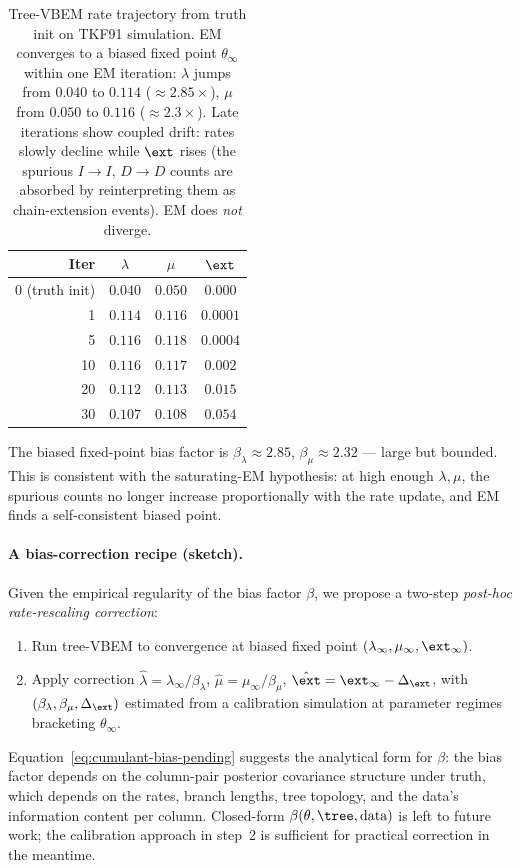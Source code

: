 \begin{table}[ht]
\centering\small
\begin{tabular}{rccc}
\toprule
Iter & $\lambda$ & $\mu$ & $\ext$ \\
\midrule
0 (truth init) & $0.040$ & $0.050$ & $0.000$ \\
1               & $0.114$ & $0.116$ & $0.0001$ \\
5               & $0.116$ & $0.118$ & $0.0004$ \\
10              & $0.116$ & $0.117$ & $0.002$ \\
20              & $0.112$ & $0.113$ & $0.015$ \\
30              & $0.107$ & $0.108$ & $0.054$ \\
\bottomrule
\end{tabular}
\caption{Tree-VBEM rate trajectory from truth init on TKF91
simulation.  EM converges to a biased fixed point $\theta_\infty$
within one EM iteration: $\lambda$ jumps from $0.040$ to
$0.114$ ($\approx 2.85\times$), $\mu$ from $0.050$ to $0.116$
($\approx 2.3\times$).  Late iterations show coupled drift: rates
slowly decline while $\ext$ rises (the spurious $I\to I$, $D\to D$
counts are absorbed by reinterpreting them as chain-extension
events).  EM does \emph{not} diverge.}
\label{tab:em-convergence-from-truth-pending}
\end{table}

The biased fixed-point bias factor is $\beta_\lambda \approx 2.85$,
$\beta_\mu \approx 2.32$ — large but bounded.  This is consistent
with the saturating-EM hypothesis: at high enough $\lambda, \mu$,
the spurious counts no longer increase proportionally with the rate
update, and EM finds a self-consistent biased point.

\paragraph{A bias-correction recipe (sketch).}
Given the empirical regularity of the bias factor $\beta$, we
propose a two-step \emph{post-hoc rate-rescaling correction}:
\begin{enumerate}[nosep]
\item Run tree-VBEM to convergence at biased fixed point
  $(\lambda_\infty, \mu_\infty, \ext_\infty)$.
\item Apply correction $\hat\lambda = \lambda_\infty / \beta_\lambda$,
  $\hat\mu = \mu_\infty / \beta_\mu$, $\hat\ext = \ext_\infty -
  \Delta_\ext$, with $(\beta_\lambda, \beta_\mu, \Delta_\ext)$
  estimated from a calibration simulation at parameter regimes
  bracketing $\theta_\infty$.
\end{enumerate}
Equation~\eqref{eq:cumulant-bias-pending} suggests the analytical form for
$\beta$: the bias factor depends on the column-pair posterior
covariance structure under truth, which depends on the rates,
branch lengths, tree topology, and the data's information content
per column.  Closed-form $\beta(\theta, \tree, \text{data})$ is
left to future work; the calibration approach in step~2 is
sufficient for practical correction in the meantime.

